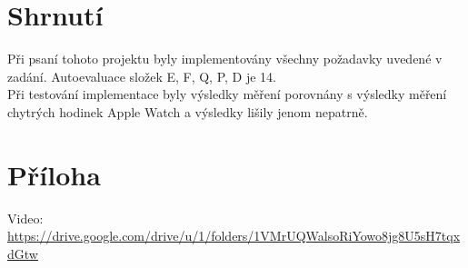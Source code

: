 \documentclass[a4paper, 12pt,h]{article}
\begin{document}
\newpage
\section{Shrnutí}
Při psaní tohoto projektu byly implementovány všechny požadavky uvedené v zadání. Autoevaluace složek E, F, Q, P, D je 14. \\ 
Při testování implementace byly výsledky měření porovnány s výsledky měření chytrých hodinek Apple Watch a výsledky lišily jenom nepatrně.

\section{Příloha}
Video: \href{https://drive.google.com/drive/u/1/folders/1VMrUQWalsoRiYowo8jg8U5sH7tqxdGtw}{https://drive.google.com/drive/u/1/folders/1VMrUQWalsoRiYowo8jg8U5sH7tqxdGtw}
\end{document}
